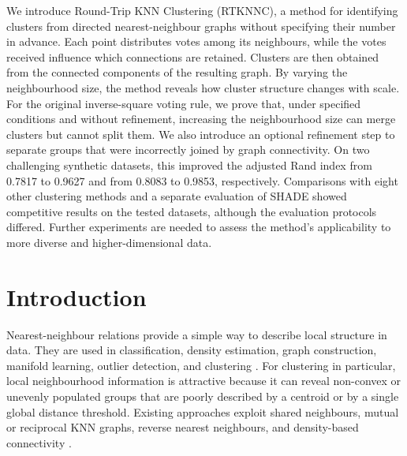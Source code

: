 \documentclass[pdflatex,sn-basic,Numbered]{sn-jnl}
\begin{document}
{We introduce Round-Trip KNN Clustering (RTKNNC), a method for identifying clusters from directed nearest-neighbour graphs without specifying their number in advance. Each point distributes votes among its neighbours, while the votes received influence which connections are retained. Clusters are then obtained from the connected components of the resulting graph. By varying the neighbourhood size, the method reveals how cluster structure changes with scale. For the original inverse-square voting rule, we prove that, under specified conditions and without refinement, increasing the neighbourhood size can merge clusters but cannot split them. We also introduce an optional refinement step to separate groups that were incorrectly joined by graph connectivity. On two challenging synthetic datasets, this improved the adjusted Rand index from 0.7817 to 0.9627 and from 0.8083 to 0.9853, respectively. Comparisons with eight other clustering methods and a separate evaluation of SHADE showed competitive results on the tested datasets, although the evaluation protocols differed. Further experiments are needed to assess the method's applicability to more diverse and higher-dimensional data.
}

\maketitle

\section{Introduction}\label{sec:introduction}

Nearest-neighbour relations provide a simple way to describe local structure in
data. They are used in classification, density estimation, graph construction,
manifold learning, outlier detection, and clustering
\citep{CoverHart1967,LoftsgaardenQuesenberry1965,Bentley1975,FriedmanBentleyFinkel1977,VonLuxburg2007}.
For clustering in particular, local neighbourhood information is attractive
because it can reveal non-convex or unevenly populated groups that are poorly
described by a centroid or by a single global distance threshold. Existing
approaches exploit shared neighbours, mutual or reciprocal KNN graphs, reverse
nearest neighbours, and density-based connectivity
\citep{JarvisPatrick1973,Ertoz2003SNN,BritoChavezQuirozYukich1997,GowdaKrishna1978,ChowdhuryAmorim2018,XieLeeWangChenZhou2019}.
\end{document}
